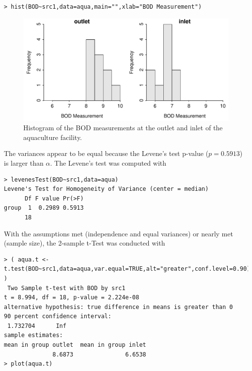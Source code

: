 \documentclass[10pt,openany]{book}\usepackage[]{graphicx}\usepackage[]{color}
\makeatletter
\newenvironment{kframe}{%
 \def\at@end@of@kframe{}%
 \ifinner\ifhmode%
  \def\at@end@of@kframe{\end{minipage}}%
  \begin{minipage}{\columnwidth}%
 \fi\fi%
 \def\FrameCommand##1{\hskip\@totalleftmargin \hskip-\fboxsep
 \colorbox{shadecolor}{##1}\hskip-\fboxsep
     \hskip-\linewidth \hskip-\@totalleftmargin \hskip\columnwidth}%
 \MakeFramed {\advance\hsize-\width
   \@totalleftmargin\z@ \linewidth\hsize
   \@setminipage}}%
 {\par\unskip\endMakeFramed%
 \at@end@of@kframe}
\newenvironment{knitrout}{}{} %
\makeatother
\begin{document}
\begin{enumerate}
\begin{knitrout}
\color{fgcolor}\begin{kframe}
\begin{verbatim}
> hist(BOD~src1,data=aqua,main="",xlab="BOD Measurement")
\end{verbatim}
\end{kframe}\begin{figure}[hbtp]

{\centering \includegraphics[width=.8\linewidth]{Figs/AquaHist-1} 

}

\caption[Histogram of the BOD measurements at the outlet and inlet of the aquaculture facility]{Histogram of the BOD measurements at the outlet and inlet of the aquaculture facility.}\label{fig:AquaHist}
\end{figure}


\end{knitrout}

The variances appear to be equal because the Levene's test p-value ($p=0.5913$) is larger than $\alpha$.  The Levene's test was computed with
\begin{knitrout}
\color{fgcolor}\begin{kframe}
\begin{verbatim}
> levenesTest(BOD~src1,data=aqua)
Levene's Test for Homogeneity of Variance (center = median)
      Df F value Pr(>F)
group  1  0.2989 0.5913
      18               
\end{verbatim}
\end{kframe}
\end{knitrout}

With the assumptions met (independence and equal variances) or nearly met (sample size), the 2-sample t-Test was conducted with
\begin{knitrout}
\color{fgcolor}\begin{kframe}
\begin{verbatim}
> ( aqua.t <- t.test(BOD~src1,data=aqua,var.equal=TRUE,alt="greater",conf.level=0.90) )
 Two Sample t-test with BOD by src1 
t = 8.994, df = 18, p-value = 2.224e-08
alternative hypothesis: true difference in means is greater than 0 
90 percent confidence interval:
 1.732704      Inf 
sample estimates:
mean in group outlet  mean in group inlet 
              8.6873               6.6538 
> plot(aqua.t)
\end{verbatim}
\end{kframe}\begin{figure}[hbtp]


\end{figure}
\end{knitrout}
\end{enumerate}
\end{document}
